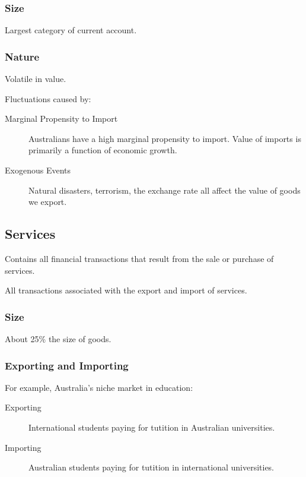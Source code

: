 \documentclass[a4paper,11pt]{report}
\begin{document}
\subsubsection{Size}

Largest category of current account.

\subsubsection{Nature}

Volatile in value.

Fluctuations caused by:

\begin{description}
\item [Marginal Propensity to Import] Australians have a high marginal
	propensity to import. Value of imports is primarily a function of economic
	growth.
\item [Exogenous Events] Natural disasters, terrorism, the exchange rate all
	affect the value of goods we export.
\end{description}

\subsection{Services}

Contains all financial transactions that result from the sale or purchase of
services.

All transactions associated with the export and import of services.

\subsubsection{Size}

About 25\% the size of goods.

\subsubsection{Exporting and Importing}

For example, Australia's niche market in education:

\begin{description}
\item [Exporting] International students paying for tutition in Australian
	universities.
\item [Importing] Australian students paying for tutition in international
	universities.
\end{description}
\end{document}
